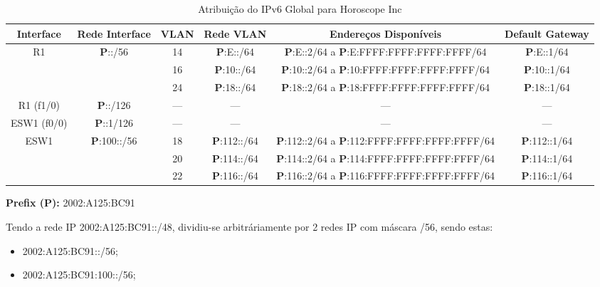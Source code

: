 \documentclass{report}
\begin{document}
\begin{table}[h!]
    \hspace*{-4.0cm}
    \centering
    \setlength{\tabcolsep}{2pt} %
    \renewcommand{\arraystretch}{1.3} %
    \begin{tabular}{|c|c|c|c|c|c|} %
        \hline
        \textbf{Interface} & \textbf{Rede Interface} & \textbf{VLAN} & \textbf{Rede VLAN} & \textbf{Endereços Disponíveis} & \textbf{Default Gateway} \\ \hline
        
        \multirow{3}{*}{R1} & \multirow{3}{*}{\textbf{P}::/56} & 14 & \textbf{P}:E::/64 & \textbf{P}:E::2/64 a \textbf{P}:E:FFFF:FFFF:FFFF:FFFF/64 & \textbf{P}:E::1/64 \\ \cline{3-6} 
         & & 16 & \textbf{P}:10::/64 & \textbf{P}:10::2/64 a \textbf{P}:10:FFFF:FFFF:FFFF:FFFF/64 & \textbf{P}:10::1/64 \\ \cline{3-6}   
         & & 24 & \textbf{P}:18::/64 & \textbf{P}:18::2/64 a \textbf{P}:18:FFFF:FFFF:FFFF:FFFF/64 & \textbf{P}:18::1/64 \\ \hline

         R1 (f1/0) & \textbf{P}::/126 & --- & --- & --- & --- \\ \hline

         ESW1 (f0/0) & \textbf{P}::1/126 & --- & --- & --- & --- \\ \hline
         
         \multirow{3}{*}{ESW1} & \multirow{3}{*}{\textbf{P}:100::/56} & 18 & \textbf{P}:112::/64 & \textbf{P}:112::2/64 a \textbf{P}:112:FFFF:FFFF:FFFF:FFFF/64 & \textbf{P}:112::1/64 \\ \cline{3-6}   
         & & 20 & \textbf{P}:114::/64 & \textbf{P}:114::2/64 a \textbf{P}:114:FFFF:FFFF:FFFF:FFFF/64 & \textbf{P}:114::1/64 \\ \cline{3-6}   
         & & 22 & \textbf{P}:116::/64 & \textbf{P}:116::2/64 a \textbf{P}:116:FFFF:FFFF:FFFF:FFFF/64 & \textbf{P}:116::1/64 \\ \hline

    \end{tabular}
    \textbf{Prefix (P):} 2002:A125:BC91
    \caption{Atribuição do IPv6 Global para Horoscope Inc}
\end{table}

Tendo a rede IP 2002:A125:BC91::/48, dividiu-se arbitráriamente por 2 redes IP com máscara /56, sendo estas: 
\begin{itemize}
    \item 2002:A125:BC91::/56;
    \item 2002:A125:BC91:100::/56; 
\end{itemize}
\end{document}
